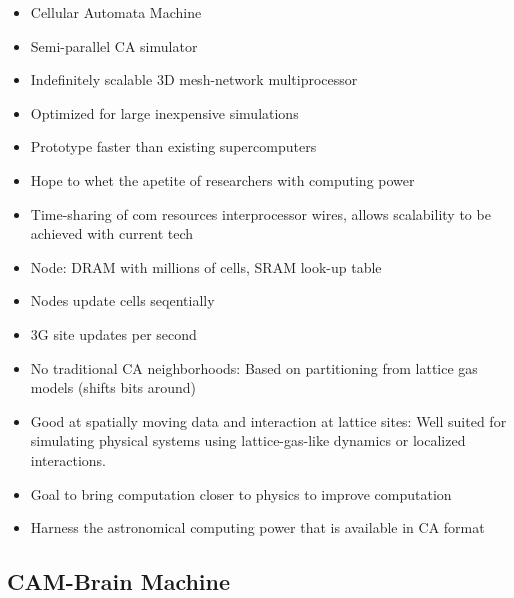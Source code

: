 \begin{itemize}
    \item Cellular Automata Machine
    \item Semi-parallel CA simulator
    \item Indefinitely scalable 3D mesh-network multiprocessor
    \item Optimized for large inexpensive simulations
    \item Prototype faster than existing supercomputers
    \item Hope to whet the apetite of researchers with computing power
    \item Time-sharing of com resources interprocessor wires, allows scalability to be achieved with current tech
    \item Node: DRAM with millions of cells, SRAM look-up table
    \item Nodes update cells seqentially
    \item 3G site updates per second
    \item No traditional CA neighborhoods: Based on partitioning from lattice gas models (shifts bits around)
    \item Good at spatially moving data and interaction at lattice sites: Well suited for simulating physical systems using lattice-gas-like dynamics or localized interactions.
    \item Goal to bring computation closer to physics to improve computation
    \item Harness the astronomical computing power that is available in CA format
\end{itemize}

\subsection{CAM-Brain Machine}

